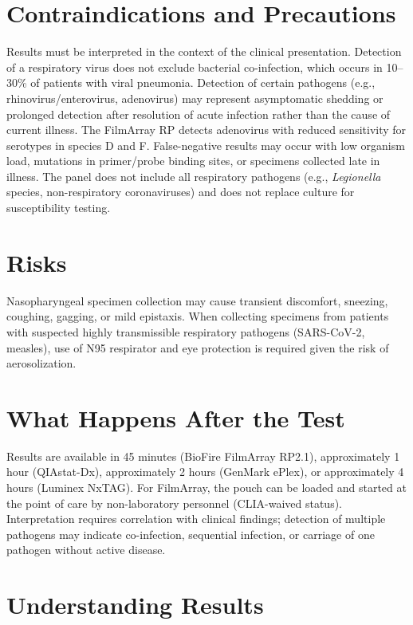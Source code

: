 \section*{Contraindications and Precautions}
Results must be interpreted in the context of the clinical presentation. Detection of a respiratory virus does not exclude bacterial co-infection, which occurs in 10--30\% of patients with viral pneumonia. Detection of certain pathogens (e.g., rhinovirus/enterovirus, adenovirus) may represent asymptomatic shedding or prolonged detection after resolution of acute infection rather than the cause of current illness. The FilmArray RP detects adenovirus with reduced sensitivity for serotypes in species D and F. False-negative results may occur with low organism load, mutations in primer/probe binding sites, or specimens collected late in illness. The panel does not include all respiratory pathogens (e.g., \textit{Legionella} species, non-respiratory coronaviruses) and does not replace culture for susceptibility testing.

\section*{Risks}
Nasopharyngeal specimen collection may cause transient discomfort, sneezing, coughing, gagging, or mild epistaxis. When collecting specimens from patients with suspected highly transmissible respiratory pathogens (SARS-CoV-2, measles), use of N95 respirator and eye protection is required given the risk of aerosolization.

\section*{What Happens After the Test}
Results are available in 45 minutes (BioFire FilmArray RP2.1), approximately 1 hour (QIAstat-Dx), approximately 2 hours (GenMark ePlex), or approximately 4 hours (Luminex NxTAG). For FilmArray, the pouch can be loaded and started at the point of care by non-laboratory personnel (CLIA-waived status). Interpretation requires correlation with clinical findings; detection of multiple pathogens may indicate co-infection, sequential infection, or carriage of one pathogen without active disease.

\section*{Understanding Results}

